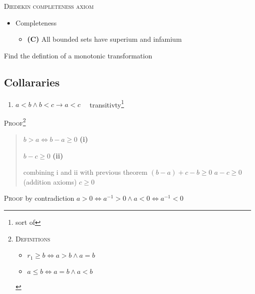 \documentclass{tufte-book}
\providecommand{\tightlist}{%
  \setlength{\itemsep}{0pt}\setlength{\parskip}{0pt}}
\begin{document}
\textsc{Diedekin completeness axiom}

\begin{itemize}
\tightlist
\item
  Completeness

  \begin{itemize}
  \tightlist
  \item
    \textbf{(C)} All bounded sets have superium and infamium
  \end{itemize}
\end{itemize}Find the defintion of a monotonic transformation

\hypertarget{collararies}{%
\subsection{Collararies}\label{collararies}}

\begin{enumerate}
\def\labelenumi{\alph{enumi})}
\setcounter{enumi}{1}
\tightlist
\item
  \(a < b \wedge b < c \to a < c\quad\) transitivty\footnote{sort of}
\end{enumerate}

\textsc{Proof}\footnote{\textsc{Definitions}

  \begin{itemize}
  \tightlist
  \item
    \(r_1 \geq b \Leftrightarrow a > b \wedge a = b\)
  \item
    \(a \leq b \Leftrightarrow a = b \wedge a < b\)
  \end{itemize}}

\begin{quote}
\(b > a \Leftrightarrow b-a \geq 0\) \textbf{(i)}

\(b -c \geq 0\) \textbf{(ii)}

combining i and ii with previous theorem \((b-a) + c - b \geq 0\)
\(a - c \geq 0\) (addition axioms) \(c \geq 0\)
\end{quote}

\textsc{Proof} by contradiction
\(a > 0 \Leftrightarrow a^{-1} > 0 \wedge a < 0 \Leftrightarrow a^{-1} < 0\)
\end{document}
